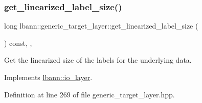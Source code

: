 \subsubsection{\texorpdfstring{get\+\_\+linearized\+\_\+label\+\_\+size()}{get\_linearized\_label\_size()}}
{\footnotesize\ttfamily long lbann\+::generic\+\_\+target\+\_\+layer\+::get\+\_\+linearized\+\_\+label\+\_\+size (\begin{DoxyParamCaption}{ }\end{DoxyParamCaption}) const\hspace{0.3cm}{\ttfamily [inline]}, {\ttfamily [override]}, {\ttfamily [virtual]}}

Get the linearized size of the labels for the underlying data. 

Implements \hyperlink{classlbann_1_1io__layer_a72a9a1411892b6f03de8b8f9923d77a6}{lbann\+::io\+\_\+layer}.



Definition at line 269 of file generic\+\_\+target\+\_\+layer.\+hpp.



